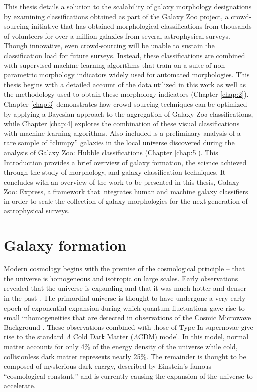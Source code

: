 This thesis details a solution to the scalability of galaxy morphology designations by examining classifications obtained as part of the Galaxy Zoo project, a crowd-sourcing initiative that has obtained morphological classifications from thousands of volunteers for over a million galaxies from several astrophysical surveys. Though innovative, even crowd-sourcing will be unable to sustain the classification load for future surveys. Instead, these classifications are combined with supervised machine learning algorithms that train on a suite of non-parametric morphology indicators widely used for automated morphologies. This thesis begins with a detailed account of the data utilized in this work as well as the methodology used to obtain these morphology indicators (Chapter \ref{chap:2}). Chapter \ref{chap:3} demonstrates how crowd-sourcing techniques can be optimized by applying a Bayesian approach to the aggregation of Galaxy Zoo classifications, while Chapter \ref{chap:4} explores the combination of these visual classifications with machine learning algorithms. Also included is a preliminary analysis of a rare sample of ``clumpy'' galaxies in the local universe discovered during the analysis of Galaxy Zoo: Hubble classifications (Chapter \ref{chap:5}). This Introduction provides a brief overview of galaxy formation, the science achieved through the study of morphology, and galaxy classification techniques. It concludes with an overview of the work to be presented in this thesis, Galaxy Zoo: Express, a framework that integrates human and machine galaxy classifiers in order to scale the collection of galaxy morphologies for the next generation of astrophysical surveys. 


\section{Galaxy formation}
Modern cosmology begins with the premise of the cosmological principle -- that the universe is homogeneous and isotropic on large scales. Early observations revealed that the universe is expanding \citep{Hubble1929,Hubble1931} and that it was much hotter and denser in the past \citep{Penzias1965,Dicke1965}.  The primordial universe is thought to have undergone a very early epoch of exponential expansion \citep{Guth1981} during which quantum fluctuations gave rise to small inhomogeneities that are detected in observations of the Cosmic Microwave Background \citep{Hinshaw2013,Planck2016}. These observations combined with those of Type Ia supernovae \citep{Riess1998,Perlmutter1998} give rise to the standard $\Lambda$ Cold Dark Matter ($\Lambda$CDM) model. In this model, normal matter accounts for only 4\% of the energy density of the universe while cold, collisionless dark matter represents nearly 25\%. The remainder is thought to be composed of mysterious dark energy, described by Einstein's famous ``cosmological constant,'' and is currently causing the expansion of the universe to accelerate.


